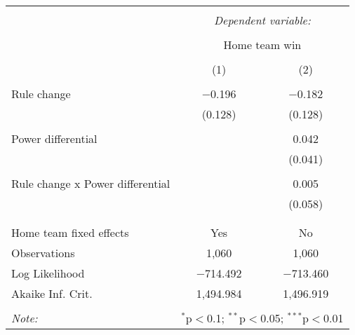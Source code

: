 
\begin{table}[!htbp] \centering 
  \caption{} 
  \label{} 
\begin{tabular}{@{\extracolsep{5pt}}lcc} 
\\[-1.8ex]\hline 
\hline \\[-1.8ex] 
 & \multicolumn{2}{c}{\textit{Dependent variable:}} \\ 
\cline{2-3} 
\\[-1.8ex] & \multicolumn{2}{c}{Home team win} \\ 
\\[-1.8ex] & (1) & (2)\\ 
\hline \\[-1.8ex] 
 Rule change & $-$0.196 & $-$0.182 \\ 
  & (0.128) & (0.128) \\ 
  & & \\ 
 Power differential &  & 0.042 \\ 
  &  & (0.041) \\ 
  & & \\ 
 
                               Rule change x Power differential &  & 0.005 \\ 
  &  & (0.058) \\ 
  & & \\ 
\hline \\[-1.8ex] 
Home team fixed effects & Yes & No \\ 
Observations & 1,060 & 1,060 \\ 
Log Likelihood & $-$714.492 & $-$713.460 \\ 
Akaike Inf. Crit. & 1,494.984 & 1,496.919 \\ 
\hline 
\hline \\[-1.8ex] 
\textit{Note:}  & \multicolumn{2}{r}{$^{*}$p$<$0.1; $^{**}$p$<$0.05; $^{***}$p$<$0.01} \\ 
\end{tabular} 
\end{table} 
